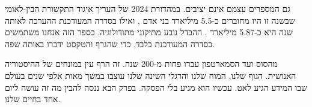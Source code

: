 \begin{factbox}
גם המספרים עצמם אינם יציבים. במהדורת 2024 של  העריך איגוד התקשורת הבין-לאומי שבשנה זו היו מחוברים כ-5.5 מיליארד בני אדם \parencite{itu2024}, ואילו בסדרה המעודכנת ההערכה לאותה שנה היא כ-5.87 מיליארד \parencite{itu2026data}. ההבדל נובע מתיקוני מתודולוגיה. בספר הזה אנחנו משתמשים בסדרה המעודכנת בלבד, כדי שהגרף והטקסט ידברו באותה שפה.
\end{factbox}

מהסוס ועד הסמארטפון עברו פחות מ-200 שנה. זה הרף עין במונחים של ההיסטוריה האנושית. הגוף שלנו, המוח שלנו והרגלי השינה שלנו עוצבו במשך מאות אלפי שנים בעולם שבו המידע הגיע לאט. עכשיו הוא מגיע בלי הפסקה. בפרק הבא ננסה להבין מה זה עושה ליום אחד בחיים שלנו.
